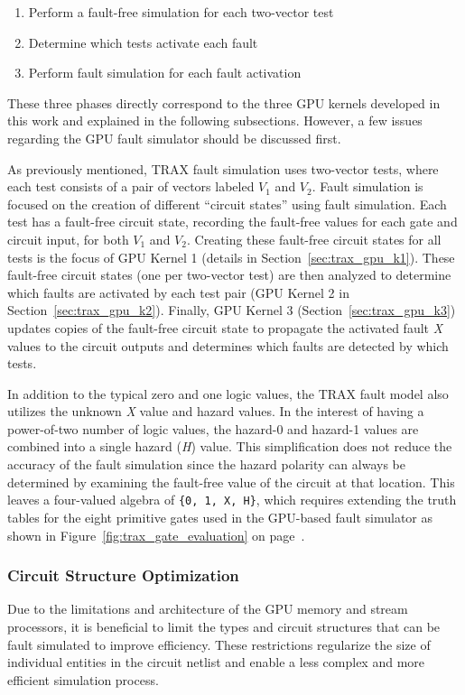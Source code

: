 \begin{enumerate}
\item Perform a fault-free simulation for each two-vector test
\item Determine which tests activate each fault
\item Perform fault simulation for each fault activation
\end{enumerate}

These three phases directly correspond to the three GPU kernels developed in this work and explained in the following subsections.
%
However, a few issues regarding the GPU fault simulator should be discussed first.

As previously mentioned, TRAX fault simulation uses two-vector tests, where each test consists of a pair of vectors labeled $V_1$ and $V_2$.
%
Fault simulation is focused on the creation of different ``circuit states'' using fault simulation.
%
Each test has a fault-free circuit state, recording the fault-free values for each gate and circuit input, for both $V_1$ and $V_2$.
%
Creating these fault-free circuit states for all tests is the focus of GPU Kernel 1 (details in Section~\ref{sec:trax_gpu_k1}).
%
These fault-free circuit states (one per two-vector test) are then analyzed to determine which faults are activated by each test pair (GPU Kernel 2 in Section~\ref{sec:trax_gpu_k2}).
%
Finally, GPU Kernel 3 (Section~\ref{sec:trax_gpu_k3}) updates copies of the fault-free circuit state to propagate the activated fault \textit{X} values to the circuit outputs and determines which faults are detected by which tests.

In addition to the typical zero and one logic values, the TRAX fault model also utilizes the unknown \textit{X} value and hazard values.
%
In the interest of having a power-of-two number of logic values, the hazard-0 and hazard-1 values are combined into a single hazard (\textit{H}) value.
%
This simplification does not reduce the accuracy of the fault simulation since the hazard polarity can always be determined by examining the fault-free value of the circuit at that location.
%
This leaves a four-valued algebra of \verb+{0, 1, X, H}+, which requires extending the truth tables for the eight primitive gates used in the GPU-based fault simulator as shown in Figure~\ref{fig:trax_gate_evaluation} on page~\pageref{fig:trax_gate_evaluation}.

\subsubsection{Circuit Structure Optimization}
Due to the limitations and architecture of the GPU memory and stream processors, it is beneficial to limit the types and circuit structures that can be fault simulated to improve efficiency.
%
These restrictions regularize the size of individual entities in the circuit netlist and enable a less complex and more efficient simulation process.

